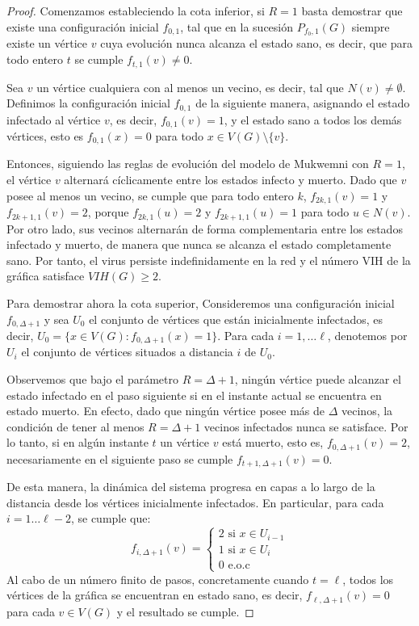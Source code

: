 \documentclass[12pt,titlepage,twoside,openright]{book}
\begin{document}
\begin{proof}
    Comenzamos estableciendo la cota inferior, si $R=1$ basta demostrar que existe una configuraci\'on inicial $f_{0,1}$, tal que en la sucesi\'on $P_{f_{0}, 1} (G)$ siempre existe un v\'ertice $v$ cuya evoluci\'on nunca alcanza el estado sano, es decir, que para todo entero $t$ se cumple $f_{t,1}(v)\neq 0$.

    Sea $v$ un v\'ertice cualquiera con al menos un vecino, es decir, tal que $N(v)\neq \emptyset$. Definimos la configuraci\'on inicial $f_{0,1}$ de la siguiente manera, asignando el estado infectado al v\'ertice $v$, es decir, $f_{0,1}(v) =1$, y el estado sano a todos los dem\'as v\'ertices, esto es $f_{0,1}(x)=0$ para todo $x\in V(G)\setminus \{v\}$. 
    
    Entonces, siguiendo las reglas de evoluci\'on del modelo de Mukwemni con $R=1$, el v\'ertice $v$ alternar\'a c\'iclicamente entre los estados infecto y muerto. Dado que $v$ posee al menos un vecino, se cumple que para todo entero $k$, $f_{2k,1}(v)= 1$ y $f_{2k+1,1}(v)= 2$, porque $f_{2k,1}(u)=2$ y $f_{2k+1,1}(u)=1$ para todo $u \in N(v)$. Por otro lado, sus vecinos alternar\'an de forma complementaria entre los estados infectado y muerto, de manera que nunca se alcanza el estado completamente sano. Por tanto, el virus persiste indefinidamente en la red y el n\'umero VIH de la gr\'afica satisface $VIH(G)\geq2$.

    Para demostrar ahora la cota superior, Consideremos una configuraci\'on inicial $f_{0,\Delta+1}$ y sea $U_0$ el conjunto de v\'ertices que est\'an inicialmente infectados, es decir, $U_0 = \{ x \in V(G) : f_{0,\Delta +1}(x)=1\}$. Para cada $i=1, \ldots \ell$, denotemos por $U_i$ el conjunto de v\'ertices situados a distancia $i$ de $U_0$.

    Observemos que bajo el par\'ametro $R= \Delta +1$, ning\'un v\'ertice puede alcanzar el estado infectado en el paso siguiente si en el instante actual se encuentra en estado muerto. En efecto, dado que ning\'un v\'ertice posee m\'as de $\Delta$ vecinos, la condici\'on de tener al menos $R= \Delta +1$ vecinos infectados nunca se satisface. Por lo tanto, si en alg\'un instante $t$ un v\'ertice $v$ est\'a muerto, esto es, $f_{0,\Delta+1}(v)=2$, necesariamente en el siguiente paso se cumple $f_{t+1, \Delta+1} (v) =0$.

    De esta manera, la din\'amica del sistema progresa en capas a lo largo de la distancia desde los v\'ertices inicialmente infectados. En particular, para cada $i =1 \ldots \ell -2$, se cumple que:$$f_{i,\Delta+1}(v)= \left\{ \begin{array}{ll} 
    2 \text{ si } x\in U_{i-1} \\
    1 \text{ si } x\in U_{i}\\
    0 \text{ e.o.c} 
    \end{array} \right.$$
    Al cabo de un n\'umero finito de pasos, concretamente cuando $t=\ell$, todos los v\'ertices de la gr\'afica se encuentran en estado sano, es decir, $f_{\ell, \Delta +1} (v) = 0$ para cada $v\in V(G)$ y el resultado se cumple. 
    

\end{proof}
\end{document}
